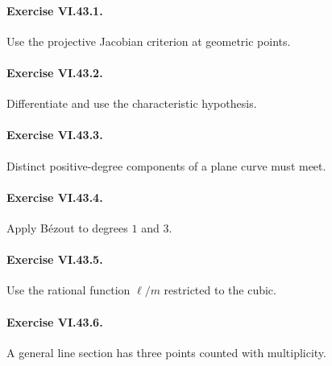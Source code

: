 \paragraph{Exercise VI.43.1.}
\begin{hint}
Use the projective Jacobian criterion at geometric points.
\end{hint}

\paragraph{Exercise VI.43.2.}
\begin{hint}
Differentiate and use the characteristic hypothesis.
\end{hint}

\paragraph{Exercise VI.43.3.}
\begin{hint}
Distinct positive-degree components of a plane curve must meet.
\end{hint}

\paragraph{Exercise VI.43.4.}
\begin{hint}
Apply Bézout to degrees \(1\) and \(3\).
\end{hint}

\paragraph{Exercise VI.43.5.}
\begin{hint}
Use the rational function \(\ell/m\) restricted to the cubic.
\end{hint}

\paragraph{Exercise VI.43.6.}
\begin{hint}
A general line section has three points counted with multiplicity.
\end{hint}

